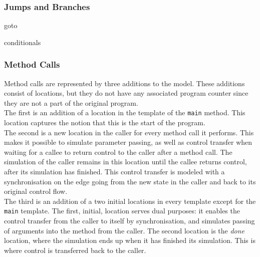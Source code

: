 \subsubsection{Jumps and Branches}
goto

conditionals
\subsubsection{Method Calls}\label{subsubsec:method}
Method calls are represented by three additions to the model. These additions consist of locations, but they do not have any associated program counter since they are not a part of the original program.\\

The first is an addition of a location in the template of the \texttt{main} method. This location captures the notion that this is the start of the program.\\

The second is a new location in the caller for every method call it performs. This makes it possible to simulate parameter passing, as well as control transfer when waiting for a callee to return control to the caller after a method call. The simulation of the caller remains in this location until the callee returns control, after its simulation has finished. This control transfer is modeled with a synchronisation on the edge going from the new state in the caller and back to its original control flow.~\\

The third is an addition of a two initial locations in every template except for the \texttt{main} template. The first, initial, location serves dual purposes: it enables the control transfer from the caller to itself by synchronisation, and simulates passing of arguments into the method from the caller. The second location is the \textit{done} location, where the simulation ends up when it has finished its simulation. This is where control is transferred back to the caller.
